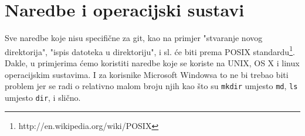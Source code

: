 \section*{Naredbe i operacijski sustavi}

Sve naredbe koje nisu specifične za git, kao na primjer "stvaranje novog direktorija", "ispis datoteka u direktoriju", i sl. će biti prema POSIX standardu\footnote{http://en.wikipedia.org/wiki/POSIX}.
Dakle, u primjerima ćemo koristiti naredbe koje se koriste na UNIX, OS X i linux operacijskim sustavima. 
I za korisnike Microsoft Windowsa to ne bi trebao biti problem jer se radi o relativno malom broju njih kao što su \verb+mkdir+ umjesto \verb+md+, \verb+ls+ umjesto \verb+dir+, i slično.
